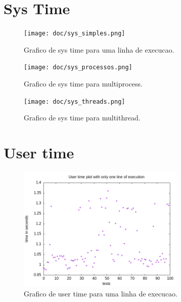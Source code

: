 \documentclass[12pt]{article}
\begin{document}
\maketitle

\section{Sys Time}
    \begin{figure}[H]
        \caption{Grafico de sys time para uma linha de execucao.}
        \centering
        \texttt{[image: doc/sys\_simples.png]}
    \end{figure}

    \begin{figure}[H]
        \caption{Grafico de sys time para multiprocess.}
        \centering
        \texttt{[image: doc/sys\_processos.png]}
    \end{figure}

    \begin{figure}[H]
        \caption{Grafico de sys time para multithread.}
        \centering
        \texttt{[image: doc/sys\_threads.png]}
    \end{figure}

\section{User time}
    \begin{figure}[H]
        \caption{Grafico de user time para uma linha de execucao.}
        \centering
        \includegraphics[width=8cm]{doc/user_simples.png}
    \end{figure}
\end{document}
